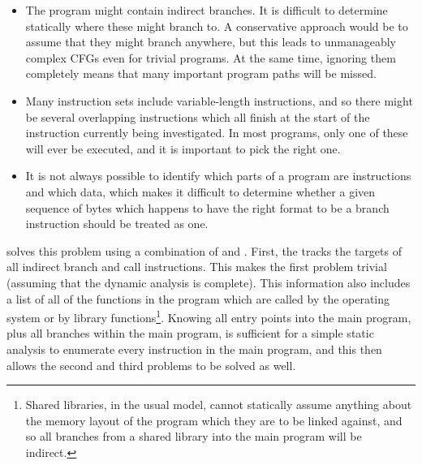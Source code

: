 \begin{itemize}
\item
  The program might contain indirect branches.  It is difficult to
  determine statically where these might branch to.  A conservative
  approach would be to assume that they might branch anywhere, but
  this leads to unmanageably complex CFGs even for trivial programs.
  At the same time, ignoring them completely means that many important
  program paths will be missed.
\item
  Many instruction sets include variable-length instructions, and so
  there might be several overlapping instructions which all finish at
  the start of the instruction currently being investigated.  In most
  programs, only one of these will ever be executed, and it is
  important to pick the right one.
\item
  It is not always possible to identify which parts of a program are
  instructions and which data, which makes it difficult to determine
  whether a given sequence of bytes which happens to have the right
  format to be a branch instruction should be treated as one.
\end{itemize}

{\Implementation} solves this problem using a combination of
 and .  First, the
 tracks the targets of all indirect branch
and call instructions.  This makes the first problem trivial (assuming
that the dynamic analysis is complete).  This information also
includes a list of all of the functions in the program which are
called by the operating system or by library functions\footnote{Shared
  libraries, in the usual model, cannot statically assume anything
  about the memory layout of the program which they are to be linked
  against, and so all branches from a shared library into the main
  program will be indirect.}.  Knowing all entry points into the main
program, plus all branches within the main program, is sufficient for
a simple static analysis to enumerate every instruction in the main
program, and this then allows the second and third problems to be
solved as well.



